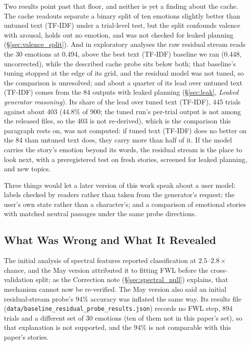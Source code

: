 \documentclass[11pt,a4paper]{article}
\begin{document}
Two results point past that floor, and neither is yet a finding about the cache. The cache readouts separate a binary split of ten emotions slightly better than untuned text (TF-IDF) under a trial-level test, but the split confounds valence with arousal, holds out no emotion, and was not checked for leaked planning (\S\ref{sec:valence_split}). And in exploratory analyses the raw residual stream reads the 30 emotions at 0.494, above the best text (TF-IDF) baseline we ran (0.448, uncorrected), while the described cache probe sits below both; that baseline's tuning stopped at the edge of its grid, and the residual model was not tuned, so the comparison is unresolved; and about a quarter of its lead over untuned text (TF-IDF) comes from the 84 outputs with leaked planning (\S\ref{sec:leak}, \emph{Leaked generator reasoning}). Its share of the lead over tuned text (TF-IDF), 445 trials against about 403 (44.8\% of 900; the tuned run's per-trial output is not among the released files, so the 403 is not re-derived), which is the comparison this paragraph rests on, was not computed: if tuned text (TF-IDF) does no better on the 84 than untuned text does, they carry more than half of it. If the model carries the story's emotion beyond its words, the residual stream is the place to look next, with a preregistered test on fresh stories, screened for leaked planning, and new topics.

Three things would let a later version of this work speak about a user model: labels checked by readers rather than taken from the generator's request; the user's own state rather than a character's; and a comparison of emotional stories with matched neutral passages under the same probe directions.

\subsection{What Was Wrong and What It Revealed}

The initial analysis of spectral features reported classification at $2.5$--$2.8\times$ chance, and the May version attributed it to fitting FWL before the cross-validation split; as the Correction note (\S\ref{sec:spectral_null}) explains, that mechanism cannot now be re-verified. The May version also said an initial residual-stream probe's $94\%$ accuracy was inflated the same way. Its results file (\texttt{data/baseline\_residual\_probe\_results.json}) records no FWL step, 894 trials and a different set of 30 emotions (ten of them not in this paper's set), so that explanation is not supported, and the $94\%$ is not comparable with this paper's stories.
\end{document}
